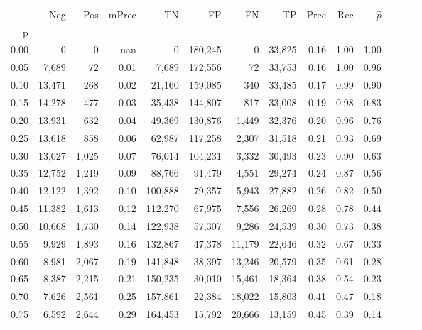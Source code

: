 \begin{tabular}{rrrrrrrrrrrrrr}
\toprule
{} &     Neg &    Pos & mPrec &       TN &       FP &      FN &      TP &  Prec &   Rec & $\hat{p}$ \\
p    &         &        &       &          &          &         &         &       &       &           \\
\midrule
0.00 &       0 &      0 &   nan &        0 &  180,245 &       0 &  33,825 &  0.16 &  1.00 &      1.00 \\
0.05 &   7,689 &     72 &  0.01 &    7,689 &  172,556 &      72 &  33,753 &  0.16 &  1.00 &      0.96 \\
0.10 &  13,471 &    268 &  0.02 &   21,160 &  159,085 &     340 &  33,485 &  0.17 &  0.99 &      0.90 \\
0.15 &  14,278 &    477 &  0.03 &   35,438 &  144,807 &     817 &  33,008 &  0.19 &  0.98 &      0.83 \\
0.20 &  13,931 &    632 &  0.04 &   49,369 &  130,876 &   1,449 &  32,376 &  0.20 &  0.96 &      0.76 \\
0.25 &  13,618 &    858 &  0.06 &   62,987 &  117,258 &   2,307 &  31,518 &  0.21 &  0.93 &      0.69 \\
0.30 &  13,027 &  1,025 &  0.07 &   76,014 &  104,231 &   3,332 &  30,493 &  0.23 &  0.90 &      0.63 \\
0.35 &  12,752 &  1,219 &  0.09 &   88,766 &   91,479 &   4,551 &  29,274 &  0.24 &  0.87 &      0.56 \\
0.40 &  12,122 &  1,392 &  0.10 &  100,888 &   79,357 &   5,943 &  27,882 &  0.26 &  0.82 &      0.50 \\
0.45 &  11,382 &  1,613 &  0.12 &  112,270 &   67,975 &   7,556 &  26,269 &  0.28 &  0.78 &      0.44 \\
0.50 &  10,668 &  1,730 &  0.14 &  122,938 &   57,307 &   9,286 &  24,539 &  0.30 &  0.73 &      0.38 \\
0.55 &   9,929 &  1,893 &  0.16 &  132,867 &   47,378 &  11,179 &  22,646 &  0.32 &  0.67 &      0.33 \\
0.60 &   8,981 &  2,067 &  0.19 &  141,848 &   38,397 &  13,246 &  20,579 &  0.35 &  0.61 &      0.28 \\
0.65 &   8,387 &  2,215 &  0.21 &  150,235 &   30,010 &  15,461 &  18,364 &  0.38 &  0.54 &      0.23 \\
0.70 &   7,626 &  2,561 &  0.25 &  157,861 &   22,384 &  18,022 &  15,803 &  0.41 &  0.47 &      0.18 \\
0.75 &   6,592 &  2,644 &  0.29 &  164,453 &   15,792 &  20,666 &  13,159 &  0.45 &  0.39 &      0.14 \\

\end{tabular}

